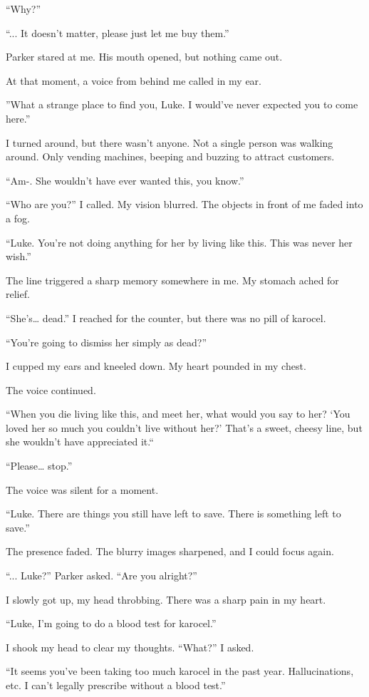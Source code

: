 “Why?”

“... It doesn’t matter, please just let me buy them.”

Parker stared at me. His mouth opened, but nothing came out.

At that moment, a voice from behind me called in my ear.

”What a strange place to find you, Luke. I would’ve never expected you to come here.”

I turned around, but there wasn’t anyone. Not a single person was walking around. Only vending machines, beeping and buzzing to attract customers.

“Am-. She wouldn’t have ever wanted this, you know.”

“Who are you?” I called. My vision blurred. The objects in front of me faded into a fog.

“Luke. You’re not doing anything for her by living like this. This was never her wish.”

The line triggered a sharp memory somewhere in me. My stomach ached for relief.

“She’s… dead.” I reached for the counter, but there was no pill of karocel. 

“You’re going to dismiss her simply as dead?”

I cupped my ears and kneeled down. My heart pounded in my chest.

The voice continued.

“When you die living like this, and meet her, what would you say to her? ‘You loved her so much you couldn’t live without her?’ That’s a sweet, cheesy line, but she wouldn’t have appreciated it.“

“Please… stop.”

The voice was silent for a moment.

“Luke. There are things you still have left to save. There is something left to save.”

The presence faded. The blurry images sharpened, and I could focus again.

“... Luke?” Parker asked. “Are you alright?”

I slowly got up, my head throbbing. There was a sharp pain in my heart.

“Luke, I’m going to do a blood test for karocel.”

I shook my head to clear my thoughts. “What?” I asked.

“It seems you’ve been taking too much karocel in the past year. Hallucinations, etc. I can’t legally prescribe without a blood test.”

